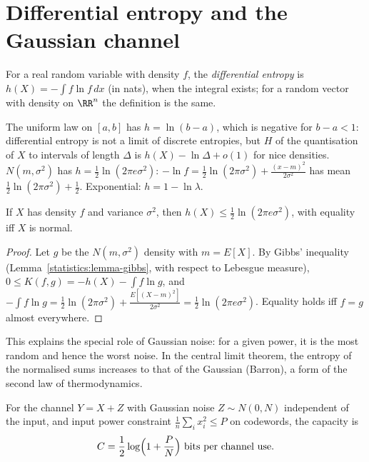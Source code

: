 \section{Differential entropy and the Gaussian channel}\label{information-theory:section-differential-entropy}

\begin{definition}\label{information-theory:definition-differential-entropy}
For a real random variable with density $f$, the \emph{differential entropy} is $h(X) = -\int f\ln f\,dx$ (in nats), when the integral exists; for a random vector with density on $\RR^n$ the definition is the same.
\end{definition}

\begin{example}\label{information-theory:example-differential-entropy}
The uniform law on $[a, b]$ has $h = \ln(b - a)$, which is negative for $b - a < 1$: differential entropy is not a limit of discrete entropies, but $H$ of the quantisation of $X$ to intervals of length $\Delta$ is
$h(X) - \ln\Delta + o(1)$ for nice densities. $N(m, \sigma^2)$ has $h = \frac12\ln(2\pi e\sigma^2)$: $-\ln f = \frac12\ln(2\pi\sigma^2) + \frac{(x - m)^2}{2\sigma^2}$ has mean $\frac12\ln(2\pi\sigma^2) + \frac12$. Exponential: $h = 1 - \ln\lambda$.
\end{example}

\begin{proposition}\label{information-theory:proposition-gaussian-max-entropy}
If $X$ has density $f$ and variance $\sigma^2$, then $h(X) \leq \frac12\ln(2\pi e\sigma^2)$, with equality iff $X$ is normal.
\end{proposition}

\begin{proof}
Let $g$ be the $N(m, \sigma^2)$ density with $m = E[X]$. By Gibbs' inequality (Lemma~\ref{statistics:lemma-gibbs}, with respect to Lebesgue measure), $0 \leq K(f, g) = -h(X) - \int f\ln g$, and
$-\int f\ln g = \frac12\ln(2\pi\sigma^2) + \frac{E[(X - m)^2]}{2\sigma^2} = \frac12\ln(2\pi e\sigma^2)$. Equality holds iff $f = g$ almost everywhere.
\end{proof}

This explains the special role of Gaussian noise: for a given power, it is the most random and hence the worst noise. In the central limit theorem, the entropy of the normalised sums increases to that of the Gaussian
(Barron), a form of the second law of thermodynamics.

\begin{theorem}\label{information-theory:theorem-gaussian-channel}
For the channel $Y = X + Z$ with Gaussian noise $Z \sim N(0, N)$ independent of the input, and input power constraint $\frac1n\sum_ix_i^2 \leq P$ on codewords, the capacity is
\[
C = \frac12\log\Bigl(1 + \frac PN\Bigr) \text{ bits per channel use}.
\]
\end{theorem}

